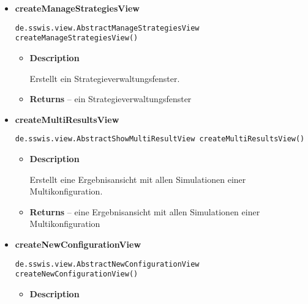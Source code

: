 {{{{\begin{itemize}
{\begin{itemize}
{Erstellt ein Ergebnisverwaltungsfenster.
}
\item{{\bf  Returns} -- 
ein Ergebnisverwaltungsfenster 
}%
\end{itemize}
}%
\item{ 
\hypertarget{de.sswis.controller.AbstractGuiFactory.createManageStrategiesView()}{{\bf  createManageStrategiesView}\\}
\begin{lstlisting}[frame=none]
de.sswis.view.AbstractManageStrategiesView createManageStrategiesView()\end{lstlisting} %
\begin{itemize}
\item{
{\bf  Description}

Erstellt ein Strategieverwaltungsfenster.
}
\item{{\bf  Returns} -- 
ein Strategieverwaltungsfenster 
}%
\end{itemize}
}%
\item{ 
\hypertarget{de.sswis.controller.AbstractGuiFactory.createMultiResultsView()}{{\bf  createMultiResultsView}\\}
\begin{lstlisting}[frame=none]
de.sswis.view.AbstractShowMultiResultView createMultiResultsView()\end{lstlisting} %
\begin{itemize}
\item{
{\bf  Description}

Erstellt eine Ergebnisansicht mit allen Simulationen einer Multikonfiguration.
}
\item{{\bf  Returns} -- 
eine Ergebnisansicht mit allen Simulationen einer Multikonfiguration 
}%
\end{itemize}
}%
\item{ 
\hypertarget{de.sswis.controller.AbstractGuiFactory.createNewConfigurationView()}{{\bf  createNewConfigurationView}\\}
\begin{lstlisting}[frame=none]
de.sswis.view.AbstractNewConfigurationView createNewConfigurationView()\end{lstlisting} %
\begin{itemize}
\item{
{\bf  Description}

}
\end{itemize}}
\end{itemize}}}}}
